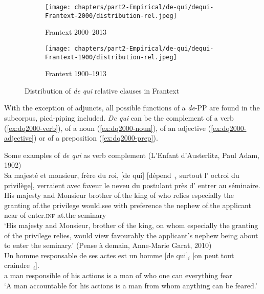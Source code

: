 \begin{figure}
    \begin{subfigure}[b]{.5\linewidth}
    \texttt{[image: chapters/part2-Empirical/de-qui/dequi-Frantext-2000/distribution-rel.jpeg]}
    \caption{Frantext 2000--2013}
    \end{subfigure}\begin{subfigure}[b]{.5\linewidth}
    \texttt{[image: chapters/part2-Empirical/de-qui/dequi-Frantext-1900/distribution-rel.jpeg]}
    \caption{Frantext 1900--1913}
    \end{subfigure}
    \caption{Distribution of \emph{de qui} relative clauses in Frantext}
    \label{fig:dequi-d2000+1900}
\end{figure}

With the exception of adjuncts, all possible functions of a \emph{de}-PP are found in the subcorpus, pied-piping included. \emph{De qui} can be the complement of a verb (\ref{ex:dq2000-verb}), of a noun (\ref{ex:dq2000-noun}), of an adjective (\ref{ex:dq2000-adjective}) or of a preposition (\ref{ex:dq2000-prep}). 


\ea Some examples of \emph{de qui} as verb complement\label{ex:dq2000-verb}
\ea (L'Enfant d'Austerlitz, Paul Adam, 1902)\\
\gll Sa majesté et monsieur, frère du roi, [de qui] [dépend~\trace{}$_i$ surtout l' octroi du privilège], verraient avec faveur le neveu du postulant près d' entrer au séminaire.\\
His majesty and Monsieur brother of.the king of who relies especially the granting of.the privilege would.see with preference the nephew of.the applicant near of enter\textsc{.inf} at.the seminary\\
\glt `His majesty and Monsieur, brother of the king, on whom especially the granting of the privilege relies, would view favourably the applicant's nephew being about to enter the seminary.'
\ex (Pense à demain, Anne-Marie Garat, 2010)\\
\gll Un homme responsable de ses actes est un homme [de qui]$_i$ [on peut tout craindre~\trace{}$_i$].\\
a man responsible of his actions is a man of who one can everything fear\\
\glt `A man accountable for his actions is a man from whom anything can be feared.'
\z 

